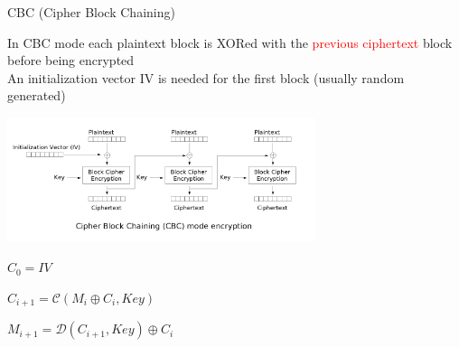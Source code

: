 \begin{frame}{CBC (Cipher Block Chaining)}

In CBC mode each plaintext block is XORed with the \textcolor{red}{previous ciphertext} block before being encrypted \\

An initialization vector IV is needed for the first block (usually random generated)
 
\medskip

\centerline{\includegraphics[width=9cm]{img/CBC.png}}

\medskip

\phantom{pad}$C_0 = IV$

\phantom{pad}$C_{i+1} = \mathcal{C}(M_i \oplus C_{i}, Key)$

\phantom{pad}$M_{i+1} = \mathcal{D}(C_{i+1}, Key) \oplus C_{i}$
\end{frame}




